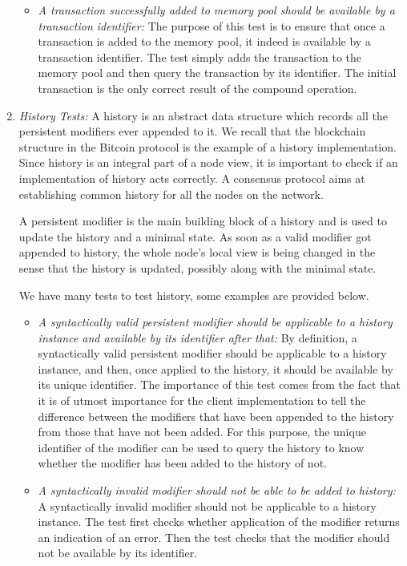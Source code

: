 \begin{enumerate}[\IEEEsetlabelwidth{Z}]
\begin{itemize}[]
\item \textit{A transaction successfully added to memory pool should be available by a transaction identifier:} The purpose of this test is to ensure that once a transaction is added to the memory pool, it indeed is available by a transaction identifier. The test simply adds the transaction to the memory pool and then query the transaction by its identifier. The initial transaction is the only correct result of the compound operation. \\
\end{itemize}
\item \textit{History Tests:} A history is an abstract data structure which records all the persistent modifiers ever appended to it. We recall that the blockchain structure in the Bitcoin protocol is the example of a history implementation. Since history is an integral part of a node view, it is important to check if an implementation of history acts correctly. A consensus protocol aims at establishing common history for all the nodes on the network.

A persistent modifier is the main building block of a history and is used to update the history and a minimal state. As soon as a valid modifier got appended to history, the whole node's local view is being changed in the sense that the history is updated, possibly along with the minimal state.

We have many tests to test history, some examples are provided below.

\begin{itemize}[]
\item \textit{A syntactically valid persistent modifier should be applicable to a history instance and available by its identifier after that:} By definition, a syntactically valid persistent modifier should be applicable to a history instance, and then, once applied to the history, it should be available by its unique identifier. The importance of this test comes from the fact that it is of utmost importance for the client implementation to tell the difference between the modifiers that have been appended to the history from those that have not been added. For this purpose, the unique identifier of the modifier can be used to query the history to know whether the modifier has been added to the history of not.\\

\item \textit{A syntactically invalid modifier should not be able to be added to history:} A syntactically invalid modifier should not be applicable to a history instance. The test first checks whether application of the modifier returns an indication of an error. Then the test checks that the modifier should not be available by its identifier.\\


\end{itemize}
\end{enumerate}

